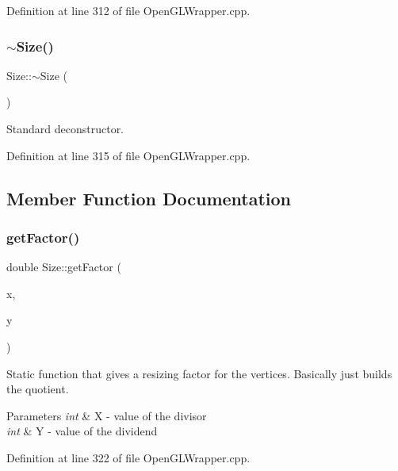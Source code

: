Definition at line 312 of file Open\+G\+L\+Wrapper.\+cpp.

\mbox{\label{classSize_a0d82fe638fc5a83beee67e2cc91d284e}} 
\subsubsection{\texorpdfstring{$\sim$Size()}{~Size()}}
{\footnotesize\ttfamily Size\+::$\sim$\+Size (\begin{DoxyParamCaption}{ }\end{DoxyParamCaption})\hspace{0.3cm}{\ttfamily [virtual]}}

Standard deconstructor. 

Definition at line 315 of file Open\+G\+L\+Wrapper.\+cpp.



\subsection{Member Function Documentation}
\mbox{\label{classSize_a1f0f20fa0d81274342165fce2355ab63}} 
\subsubsection{\texorpdfstring{getFactor()}{getFactor()}}
{\footnotesize\ttfamily double Size\+::get\+Factor (\begin{DoxyParamCaption}\item[{int}]{x,  }\item[{int}]{y }\end{DoxyParamCaption})\hspace{0.3cm}{\ttfamily [static]}}



Static function that gives a resizing factor for the vertices. Basically just builds the quotient. 


\begin{DoxyParams}{Parameters}
{\em int} & X -\/ value of the divisor \\
\hline
{\em int} & Y -\/ value of the dividend \\
\hline
\end{DoxyParams}


Definition at line 322 of file Open\+G\+L\+Wrapper.\+cpp.

